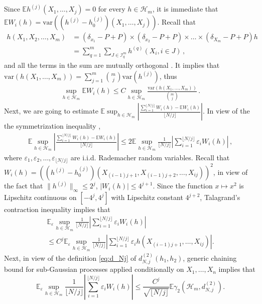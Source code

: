 \documentclass[12pt]{article}
\newcommand\var{\mathrm{var}}
\def\l{\left}
\def\r{\right}
\newcommand{\mb}{\mathbb}
\theoremstyle{thmstyletwo}%
\theoremstyle{thmstylethree}%
\begin{document}
    Since $\mb E h^{(j)}(X_1,\ldots,X_j) = 0$ for every $h \in \mathcal{H}_m$, it is immediate that $\mb E W_{i}(h) = \var \l(\l(h^{(j)} -h_0^{(j)}\r)(X_1,\ldots,X_j)\r)$. Recall that
    \begin{align*}
        h(X_1, X_2, \ldots, X_m) &= (\delta_{x_1} - P + P) \times (\delta_{x_2} - P + P) \times \ldots \times (\delta_{X_m} - P + P)h \\
        &= \sum_{q=1}^m \sum_{J \in \mathcal{I}^m_q} h^{(q)}(X_i, i \in J) \,,
    \end{align*}
    and all the terms in the sum are mutually orthogonal \citep[][Theorem 3 of Chapter 1.6]{lee2019u}. It implies that $\var (h(X_1,\ldots,X_m)) = \sum_{j=1}^m {m \choose j}\var\l(h^{(j)}\r)$, thus
    \begin{align}\label{eq:var-decomposition}
        \sup_{h \in \mathcal{H}_m} \mb E W_{i}(h)\leq C\sup_{h \in \mathcal{H}_m} \frac{\var(h(X_1,\ldots,X_m))}{{m \choose j}}\,.
    \end{align}
    Next, we are going to estimate $\mb E \sup_{h \in \mathcal{H}_m} \l\lvert \frac{\sum_{i=1}^{\lfloor N/j \rfloor} W_{i}(h) - \mb E W_{i}(h)}{\lfloor N/j \rfloor} \r\rvert$. In view of the the symmetrization inequality \citep{wellner2013weak},
    \begin{align*}
        \mb E \sup_{h \in \mathcal{H}_m} \l\lvert \frac{\sum_{i=1}^{\lfloor N/j \rfloor} W_{i}(h) - \mb E W_{i}(h)}{\lfloor N/j \rfloor} \r\rvert \leq 2 \mb E \sup_{h \in \mathcal{H}_m} \frac{1}{\lfloor N/j \rfloor} \l\lvert \sum_{i = 1}^{\lfloor N/j \rfloor} \varepsilon_i W_{i}(h)\r\rvert \,,
    \end{align*}
    where $\varepsilon_1, \varepsilon_2, \ldots, \varepsilon_{\lfloor N/j \rfloor}$ are i.i.d. Rademacher random variables. Recall that $W_{i}(h) = \l(\l(h^{(j)} -h_0^{(j)}\r)(X_{(i-1)j + 1}, X_{(i-1)j + 2}, \ldots, X_{ij})\r)^2$, in view of the fact that $\|h^{(j)}\|_\infty\leq 2^j$,  $\l\lvert W_{i}(h)\r\rvert \leq 4^{j+1}$. Since the function $x \mapsto x^2$ is Lipschitz continuous on $[-4^j, 4^j]$ with Lipschitz constant $4^{j+2}$, Talagrand's contraction inequality implies that
    \begin{multline*}
        \mb E_\varepsilon \sup_{h \in \mathcal{H}_m} \frac{1}{\lfloor N/j \rfloor} \l\lvert \sum_{i = 1}^{\lfloor N/j \rfloor} \varepsilon_i W_{i}(h)\r\rvert 
        \\
        \leq C^j \mb E_\varepsilon \sup_{h \in \mathcal{H}_m} \frac{1}{\lfloor N/j \rfloor} \l\lvert \sum_{i = 1}^{\lfloor N/j \rfloor} \varepsilon_i h \l(X_{(i-1)j + 1}, \ldots , X_{ij}\r)\r\rvert.
    \end{multline*}
    Next, in view of the definition \eqref{eq:d_Nj} of $d^{(2)}_{N,j}(h_1, h_2)$, generic chaining bound for sub-Gaussian processes \citep{talagrand2014upper} applied conditionally on $X_1,\ldots,X_n$ implies that 
    \[
    \mb E_\varepsilon \sup_{h \in \mathcal{H}_m} \frac{1}{\lfloor N/j \rfloor} \l\lvert \sum_{i = 1}^{\lfloor N/j \rfloor} \varepsilon_i W_{i}(h)\r\rvert
    \leq
    \frac{C^j}{\sqrt{\lfloor N/j \rfloor}} \mb E \gamma_2 \l(\mathcal{H}_m, d_{N,j}^{(2)}\r).
    \]
    
\end{document}
